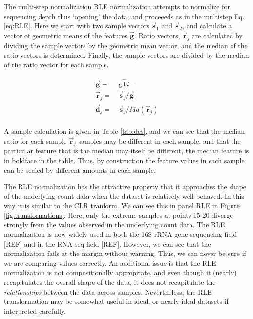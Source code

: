 \documentclass[
  onecolumn]{article}
\newcommand{\vect}[1]{\vec{\textbf{#1}}}
\begin{document}
The multi-step normalization RLE normalization attempts to normalize for sequencing depth thus `opening' the data, and proceeeds as in the multistep Eq. \ref{eq:RLE}. Here we start with two sample vectors \(\vec{\textbf{s}}_1\) and \(\vec{\textbf{s}}_2\), and calculate a vector of geometric means of the features \(\vec{\textbf{g}}\). Ratio vectors, \(\vec{\textbf{r}}_j\) are calculated by dividing the sample vectors by the geometric mean vector, and the median of the ratio vectors is determined. Finally, the sample vectors are divided by the median of the ratio vector for each sample.

\begin{equation}
    \begin{aligned}
        \vec{\textbf{g}} = &\ \mathrm{g}\vect{f}{i-}\\
        \vec{\textbf{r}}_j = &\ \vec{\textbf{s}}_j / \vec{\textbf{g}}\\
        \vec{\textbf{d}}_j = &\ \vec{\textbf{s}}_j / Md(\vec{\textbf{r}}_j)\\
    \end{aligned}
\label{eq:RLE}
\end{equation}

A sample calculation is given in Table \ref{tab:des}, and we can see that the median ratio for each sample \(\vec{\textbf{r}}_j\) samples may be different in each sample, and that the particular feature that is the median may itself be different, the median feature is in boldface in the table. Thus, by construction the feature values in each sample can be scaled by different amounts in each sample.

The RLE normalization has the attractive property that it approaches the shape of the underlying count data when the dataset is relatively well behaved. In this way it is similar to the CLR tranform. We can see this in panel RLE in Figure \ref{fig:transformations}. Here, only the extreme samples at points 15-20 diverge strongly from the values observed in the underlying count data. The RLE normalization is now widely used in both the 16S rRNA gene sequencing field {[}REF{]} and in the RNA-seq field {[}REF{]}. However, we can see that the normalization fails at the margin without warning. Thus, we can never be sure if we are comparing values correctly. An additional issue is that the RLE normalization is not compositionally appropriate, and even though it (nearly) recapitulates the overall shape of the data, it does not recapitulate the \emph{relationships} between the data across samples. Nevertheless, the RLE transformation may be somewhat useful in ideal, or nearly ideal datasets if interpreted carefully.
\end{document}
